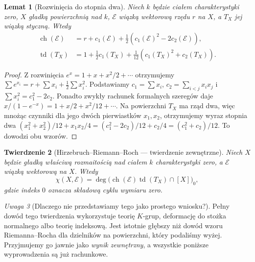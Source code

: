 \documentclass[11pt,a4paper,openany]{report}
\numberwithin{equation}{section}
\theoremstyle{plain}
\newtheorem{twierdzenie}{Twierdzenie}[section]
\newtheorem{lemat}[twierdzenie]{Lemat}
\theoremstyle{definition}
\theoremstyle{remark}
\newtheorem{uwaga}[twierdzenie]{Uwaga}
\begin{document}
\begin{lemat}[Rozwinięcia do stopnia dwa]
\label{lem:ga7-ch-td-surface}
Niech $k$ będzie ciałem charakterystyki zero,
$X$ gładką powierzchnią nad $k$,
$\mathcal E$ wiązką wektorową rzędu $r$ na $X$,
a $T_X$ jej wiązką styczną. Wtedy
\[
\begin{aligned}
\operatorname{ch}(\mathcal E)&=r+c_1(\mathcal E)
+\tfrac12(c_1(\mathcal E)^2-2c_2(\mathcal E)),\\
\operatorname{td}(T_X)&=1+\tfrac12 c_1(T_X)
+\tfrac1{12}(c_1(T_X)^2+c_2(T_X)).
\end{aligned}
\]
\end{lemat}
\begin{proof}
Z rozwinięcia $e^x=1+x+x^2/2+\cdots$ otrzymujemy
$\sum e^{x_i}=r+\sum x_i+\frac12\sum x_i^2$.
Podstawiamy
$c_1=\sum x_i$, $c_2=\sum_{i<j}x_ix_j$ i
$\sum x_i^2=c_1^2-2c_2$.
Ponadto zwykły rachunek formalnych szeregów daje
$x/(1-e^{-x})=1+x/2+x^2/12+\cdots$.
Na powierzchni $T_X$ ma rząd dwa, więc mnożąc
czynniki dla jego dwóch pierwiastków
$x_1,x_2$, otrzymujemy wyraz stopnia dwa
$(x_1^2+x_2^2)/12+x_1x_2/4
=(c_1^2-2c_2)/12+c_2/4=(c_1^2+c_2)/12$.
To dowodzi obu wzorów.
\end{proof}

\begin{twierdzenie}[Hirzebruch--Riemann--Roch — twierdzenie zewnętrzne]
\label{tw:ga7-hrr}
Niech $X$ będzie gładką właściwą rozmaitością nad
ciałem $k$ charakterystyki zero, a $\mathcal E$
wiązką wektorową na $X$. Wtedy
\[
\chi(X,\mathcal E)=\deg\bigl(
\operatorname{ch}(\mathcal E)\operatorname{td}(T_X)
\cap[X]\bigr)_{0},
\]
gdzie indeks $0$ oznacza składową cyklu wymiaru zero.
\end{twierdzenie}

\begin{uwaga}[Dlaczego nie przedstawiamy tego jako prostego wniosku?]
Pełny dowód tego twierdzenia wykorzystuje
teorię $K$-grup, deformację do stożka normalnego
albo teorię indeksową. Jest istotnie
głębszy niż dowód wzoru Riemanna--Rocha dla dzielników
na powierzchni, który podaliśmy wyżej.
Przyjmujemy go jawnie jako \emph{wynik zewnętrzny},
a wszystkie poniższe wyprowadzenia są już rachunkowe.
\end{uwaga}
\end{document}
